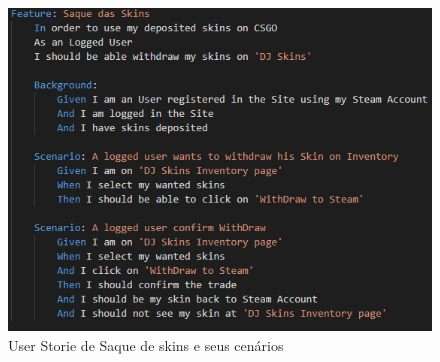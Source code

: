 \documentclass[
    12pt,               %
    openright,          %
    oneside,
    a4paper,            %
    MODELO,             %
    TODO,               %
    english,            %
    brazil              %
    ]{ifsp-spo-inf-ctds} %
\begin{document}
\begin{apendicesenv}
	\begin{figure}[!htb]
		\centering
		\includegraphics[scale=0.9]{Imagens/SaqueSkins.png}
		\caption{User Storie de Saque de skins e seus cenários}
	\end{figure}

	
\end{apendicesenv}
\end{document}
